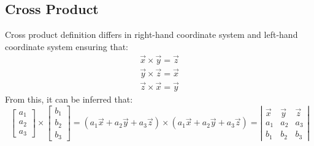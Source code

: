 \documentclass[12pt]{article}
\begin{document}
    \subsection{Cross Product}
    Cross product definition differs in right-hand coordinate system and left-hand
    coordinate system ensuring that:
    \[ \begin{array}{c}
        \overrightarrow{x} \times \overrightarrow{y} = \overrightarrow{z} \\
        \overrightarrow{y} \times \overrightarrow{z} = \overrightarrow{x} \\
        \overrightarrow{z} \times \overrightarrow{x} = \overrightarrow{y}
    \end{array} \]
    From this, it can be inferred that:
    \[
        \left[ \begin{array}{c}
            a_1 \\ a_2 \\ a_3
        \end{array} \right]
        \times
        \left[ \begin{array}{c}
            b_1 \\ b_2 \\ b_3
        \end{array} \right]
        =
        \left(
            a_1\overrightarrow{x} + a_2\overrightarrow{y} + a_3\overrightarrow{z}
        \right)
        \times
        \left(
            a_1\overrightarrow{x} + a_2\overrightarrow{y} + a_3\overrightarrow{z}
        \right)
        =
        \left| \begin{array}{ccc}
            \overrightarrow{x} & \overrightarrow{y} & \overrightarrow{z} \\
            a_1 & a_2 & a_3 \\
            b_1 & b_2 & b_3
        \end{array} \right|
    \]
\end{document}
